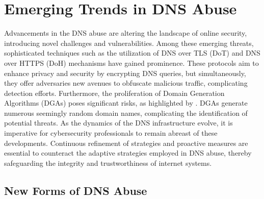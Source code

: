 \section{Emerging Trends in DNS Abuse}

Advancements in the DNS abuse are altering the landscape of online security, introducing novel challenges and vulnerabilities. Among these emerging threats, sophisticated techniques such as the utilization of DNS over TLS (DoT) and DNS over HTTPS (DoH) mechanisms have gained prominence. These protocols aim to enhance privacy and security by encrypting DNS queries, but simultaneously, they offer adversaries new avenues to obfuscate malicious traffic, complicating detection efforts. Furthermore, the proliferation of Domain Generation Algorithms (DGAs) poses significant risks, as highlighted by \cite{kapoor2021ransomware}.  DGAs generate numerous seemingly random domain names, complicating the identification of potential threats. As the dynamics of the DNS infrastructure evolve, it is imperative for cybersecurity professionals to remain abreast of these developments. Continuous refinement of strategies and proactive measures are essential to counteract the adaptive strategies employed in DNS abuse, thereby safeguarding the integrity and trustworthiness of internet systems.

\subsection{New Forms of DNS Abuse}

